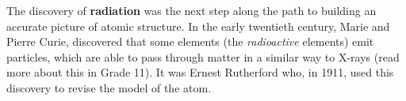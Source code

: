 \par
{}
        \label{m38756*id254642}The discovery of \textbf{radiation} was the next step along the path to building an accurate picture of atomic structure. In the early twentieth century, Marie and Pierre Curie, discovered that some elements (the \textsl{radioactive} elements) emit particles, which are able to pass through matter in a similar way to X-rays (read more about this in Grade 11). It was Ernest Rutherford who, in 1911, used this discovery to revise the model of the atom.\par 
      \label{m38756*eip-956}

      \label{m38756*uid3}
